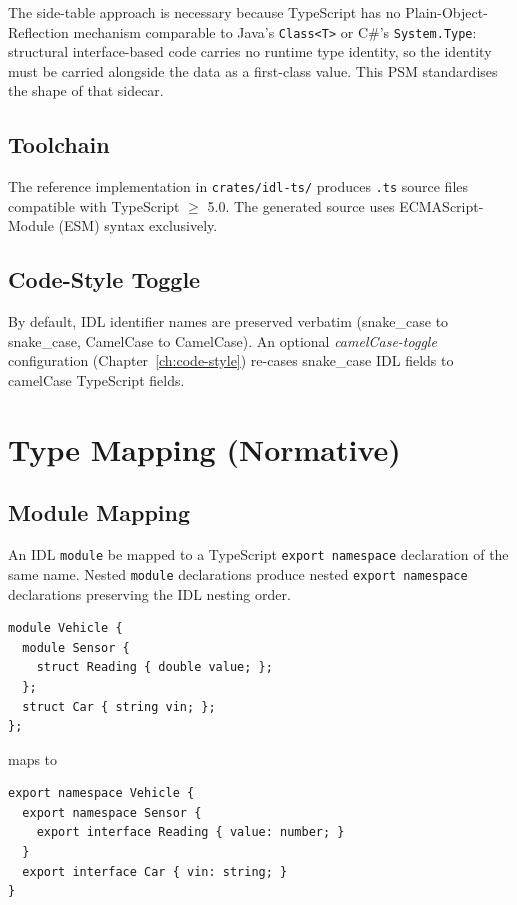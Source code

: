 \documentclass{../styles/zerodds-vendor-spec}
\begin{document}
The side-table approach is necessary because TypeScript has no
Plain-Object-Reflection mechanism comparable to Java's
\texttt{Class<T>} or C\#'s \texttt{System.Type}: structural
interface-based code carries no runtime type identity, so the
identity must be carried alongside the data as a first-class
value. This PSM standardises the shape of that sidecar.

\section{Toolchain}

The reference implementation in \texttt{crates/idl-ts/} produces
\texttt{.ts} source files compatible with TypeScript $\geq$ 5.0. The
generated source uses ECMAScript-Module (ESM) syntax exclusively.

\section{Code-Style Toggle}

By default, IDL identifier names are preserved verbatim
(snake\_case to snake\_case, CamelCase to CamelCase). An optional
\emph{camelCase-toggle} configuration (Chapter~\ref{ch:code-style})
re-cases snake\_case IDL fields to camelCase TypeScript fields.

\chapter{Type Mapping (Normative)}\label{ch:type-mapping}

\section{Module Mapping}\label{sec:module-mapping}

An IDL \texttt{module}  be mapped to a TypeScript
\texttt{export namespace} declaration of the same name. Nested
\texttt{module} declarations  produce nested
\texttt{export namespace} declarations preserving the IDL nesting
order.

\begin{specexample}
\begin{lstlisting}
module Vehicle {
  module Sensor {
    struct Reading { double value; };
  };
  struct Car { string vin; };
};
\end{lstlisting}
maps to
\begin{lstlisting}
export namespace Vehicle {
  export namespace Sensor {
    export interface Reading { value: number; }
  }
  export interface Car { vin: string; }
}
\end{lstlisting}
\end{specexample}
\end{document}
